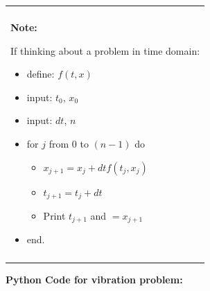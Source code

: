 \documentclass[10pt,b5paper,titlepage]{book}
\newenvironment{bbox}[1][0.96]
{
    \begin{center}
        \begin{tabular}{|p{#1\textwidth}|}
            \hline\\
}
{
            \\\\\hline
        \end{tabular}
    \end{center}
}
\begin{document}
\begin{bbox}[0.96]
\textbf{Note:}

If thinking about a problem in time domain:

\begin{itemize}
    \item define: $ f(t,x) $

    \item input: $ t_0 $, $ x_0 $

    \item input: $ dt $, $ n $

    \item for $ j $ from $ 0 $ to $ (n-1) $ do
        \begin{itemize}
            \item $ x_{j+1} = x_j + dt f(t_j, x_j) $
            \item $ t_{j+1} = t_j + dt $
            \item Print $ t_{j+1} $ and $= x_{j+1} $
        \end{itemize}
    \item end.
\end{itemize}

\end{bbox}


\newpage
\textbf{Python Code for vibration problem:}
\end{document}
